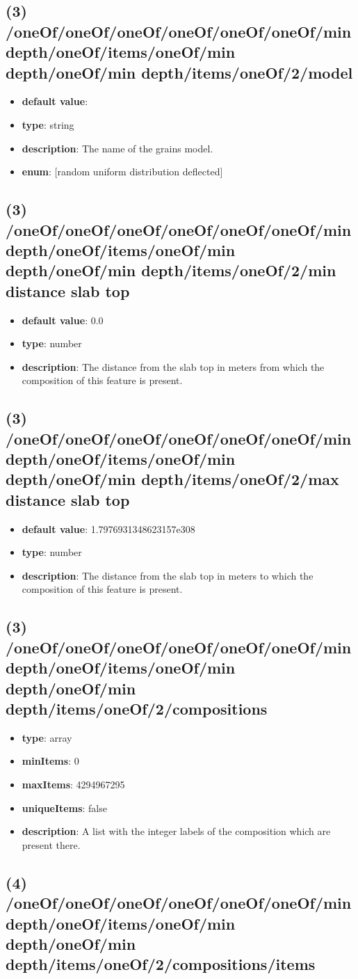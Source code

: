 \subsection{(3) /oneOf/oneOf/oneOf/oneOf/oneOf/oneOf/min depth/oneOf/items/oneOf/min depth/oneOf/min depth/items/oneOf/2/model}
\begin{itemize}[leftmargin=3em]\item {\bf default value}: 
\item {\bf type}: string
\item {\bf description}: The name of the grains model.
\item {\bf enum}: [random uniform distribution deflected]\end{itemize}\subsection{(3) /oneOf/oneOf/oneOf/oneOf/oneOf/oneOf/min depth/oneOf/items/oneOf/min depth/oneOf/min depth/items/oneOf/2/min distance slab top}
\begin{itemize}[leftmargin=3em]\item {\bf default value}: 0.0
\item {\bf type}: number
\item {\bf description}: The distance from the slab top in meters from which the composition of this feature is present.
\end{itemize}\subsection{(3) /oneOf/oneOf/oneOf/oneOf/oneOf/oneOf/min depth/oneOf/items/oneOf/min depth/oneOf/min depth/items/oneOf/2/max distance slab top}
\begin{itemize}[leftmargin=3em]\item {\bf default value}: 1.7976931348623157e308
\item {\bf type}: number
\item {\bf description}: The distance from the slab top in meters to which the composition of this feature is present.
\end{itemize}\subsection{(3) /oneOf/oneOf/oneOf/oneOf/oneOf/oneOf/min depth/oneOf/items/oneOf/min depth/oneOf/min depth/items/oneOf/2/compositions}
\begin{itemize}[leftmargin=3em]\item {\bf type}: array
\item {\bf minItems}: 0
\item {\bf maxItems}: 4294967295
\item {\bf uniqueItems}: false
\item {\bf description}: A list with the integer labels of the composition which are present there.
\end{itemize}\subsection{(4) /oneOf/oneOf/oneOf/oneOf/oneOf/oneOf/min depth/oneOf/items/oneOf/min depth/oneOf/min depth/items/oneOf/2/compositions/items}
